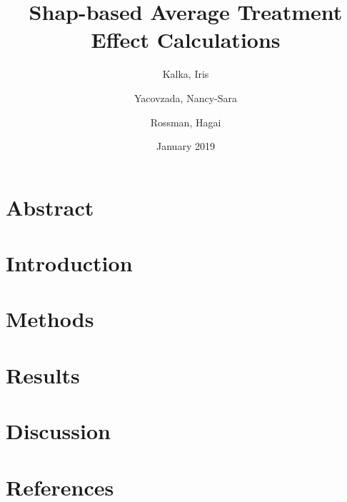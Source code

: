 \documentclass{article}
\title{Shap-based Average Treatment Effect Calculations}
\author{Kalka, Iris
        \and
        Yacovzada, Nancy-Sara
        \and
        Rossman, Hagai}
\date{January 2019}
\begin{document}
\maketitle

\section{Abstract}

\section{Introduction}

\section{Methods}

\section{Results}

\section{Discussion}

\section{References}
\end{document}

